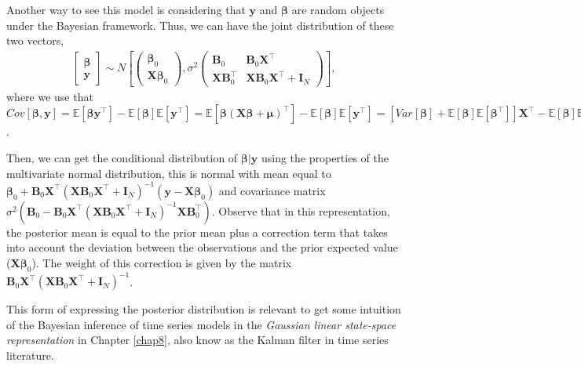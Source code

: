 Another way to see this model is considering that $\bm{y}$ and $\bm{\beta}$ are random objects under the Bayesian framework. Thus, we can have the joint distribution of these two vectors,
\begin{align*}
	\begin{bmatrix}
		\bm{\beta}\\ 
		\bm{y}
	\end{bmatrix}\sim N\left [ \begin{pmatrix}
		\bm{\beta}_{0} \\
		\bm{X}\bm{\beta}_{0}
	\end{pmatrix} , \sigma^2\begin{pmatrix}
		\bm{B}_{0} & \bm{B}_{0} \bm{X}^{\top} \\ 
		\bm{X}\bm{B}_{0}^{\top} & \bm{X}\bm{B}_{0}\bm{X}^{\top}+\bm{I}_N
	\end{pmatrix}\right ],
\end{align*}
where we use that $Cov[\bm{\beta},\bm{y}]=\mathbb{E}[\bm{\beta}\bm{y}^{\top}]-\mathbb{E}[\bm{\beta}]\mathbb{E}[\bm{y}^{\top}]=\mathbb{E}[\bm{\beta}(\bm{X}\bm{\beta}+\bm{\mu})^{\top}]-\mathbb{E}[\bm{\beta}]\mathbb{E}[\bm{y}^{\top}]=[Var[\bm{\beta}]+\mathbb{E}[\bm{\beta}]\mathbb{E}[\bm{\beta}^{\top}]]\bm{X}^{\top}-\mathbb{E}[\bm{\beta}]\mathbb{E}[\bm{y}^{\top}]=\sigma^2\bm{B}_0\bm{X}^{\top}+\bm{\beta}_0\bm{\beta}_0^{\top}\bm{X}^{\top}-\bm{\beta}_0\bm{\beta}_0^{\top}\bm{X}^{\top}=\sigma^2\bm{B}_0\bm{X}^{\top}$.

Then, we can get the conditional distribution of $\bm{\beta}|\bm{y}$ using the properties of the multivariate normal distribution, this is normal with mean equal to $\bm{\beta}_{0}+\bm{B}_{0}\bm{X}^{\top}(\bm{X}\bm{B}_{0}\bm{X}^{\top}+ \bm{I}_N)^{-1}(\bm{y}-\bm{X}\bm{\beta}_{0})$ and covariance matrix $\sigma^2(\bm{B}_{0}-\bm{B}_{0}\bm{X}^{\top}(\bm{X}\bm{B}_{0}\bm{X}^{\top}+\bm{I}_N)^{-1} \bm{X}\bm{B}_{0}^{\top})$. Observe that in this representation, the posterior mean is equal to the prior mean plus a correction term that takes into account the deviation between the observations and the prior expected value ($\bm{X}\bm{\beta}_{0}$). The weight of this correction is given by the matrix $\bm{B}_{0}\bm{X}^{\top}(\bm{X}\bm{B}_{0}\bm{X}^{\top}+ \bm{I}_N)^{-1}$. 

This form of expressing the posterior distribution is relevant to get some intuition of the Bayesian inference of time series models in the \textit{Gaussian linear state-space representation} in Chapter \ref{chap8}, also know as the Kalman filter in time series literature.

